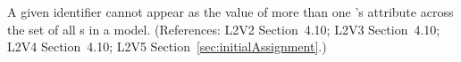 A given identifier cannot appear as the value of more than one
\InitialAssignment{}'s  attribute across
the set of all \InitialAssignment{}s in a model.  (References:
L2V2 Section~4.10; L2V3
Section~4.10; L2V4 Section~4.10; L2V5 Section~\ref{sec:initialAssignment}.)
